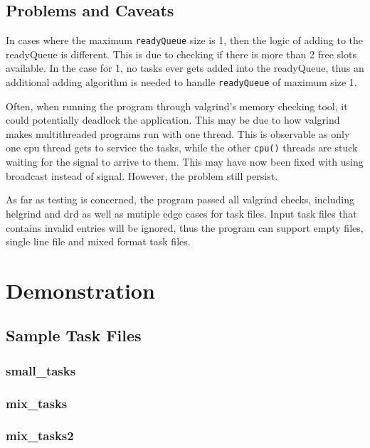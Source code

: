 \documentclass[a4paper, 12pt, titlepage]{article}
\newcommand{\code}[1]{\small\texttt{#1}\normalsize}
\begin{document}
\subsection{Problems and Caveats}
In cases where the maximum \code{readyQueue} size is 1, then the logic of
adding to the readyQueue is different. This is due to checking if there is more
than 2 free slots available. In the case for 1, no tasks ever gets added into
the readyQueue, thus an additional adding algorithm is needed to handle
\code{readyQueue} of maximum size 1.

Often, when running the program through valgrind's memory checking tool, it
could potentially deadlock the application. This may be due to how valgrind
makes multithreaded programs run with one thread. This is observable as only
one cpu thread gets to service the tasks, while the other \code{cpu()} threads
are stuck waiting for the signal to arrive to them. This may have now been
fixed with using broadcast instead of signal. However, the problem still
persist.

As far as testing is concerned, the program passed all valgrind checks,
including helgrind and drd as well as mutiple edge cases for task files. Input
task files that contains invalid entries will be ignored, thus the program can
support empty files, single line file and mixed format task files.

\newpage
\section{Demonstration}
\subsection{Sample Task Files}
\subsubsection{small\_tasks}


\subsubsection{mix\_tasks}


\subsubsection{mix\_tasks2}

\end{document}
